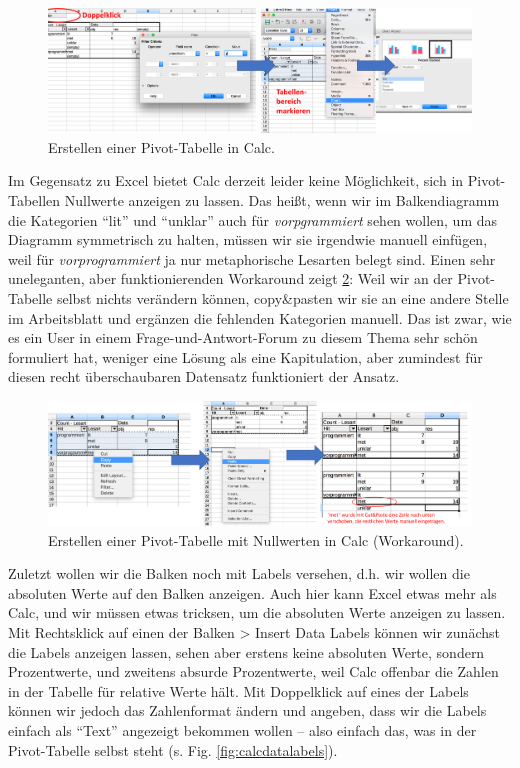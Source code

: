 \documentclass[]{article}
\begin{document}
\begin{figure}
\includegraphics[width=6.66in]{docs/fig/calc_chart} \caption{Erstellen einer Pivot-Tabelle in Calc.}\label{fig:calcchart}
\end{figure}

Im Gegensatz zu Excel bietet Calc derzeit leider keine Möglichkeit, sich
in Pivot-Tabellen Nullwerte anzeigen zu lassen. Das heißt, wenn wir im
Balkendiagramm die Kategorien \enquote{lit} und \enquote{unklar} auch
für \emph{vorpgrammiert} sehen wollen, um das Diagramm symmetrisch zu
halten, müssen wir sie irgendwie manuell einfügen, weil für
\emph{vorprogrammiert} ja nur metaphorische Lesarten belegt sind. Einen
sehr uneleganten, aber funktionierenden Workaround zeigt
\ref{fig:calcchart2}: Weil wir an der Pivot-Tabelle selbst nichts
verändern können, copy\&pasten wir sie an eine andere Stelle im
Arbeitsblatt und ergänzen die fehlenden Kategorien manuell. Das ist
zwar, wie es ein User in einem Frage-und-Antwort-Forum zu diesem Thema
sehr schön formuliert hat, weniger eine Lösung als eine Kapitulation,
aber zumindest für diesen recht überschaubaren Datensatz funktioniert
der Ansatz.

\begin{figure}
\includegraphics[width=6.66in]{docs/fig/calc_chart2} \caption{Erstellen einer Pivot-Tabelle mit Nullwerten in Calc (Workaround).}\label{fig:calcchart2}
\end{figure}

Zuletzt wollen wir die Balken noch mit Labels versehen, d.h. wir wollen
die absoluten Werte auf den Balken anzeigen. Auch hier kann Excel etwas
mehr als Calc, und wir müssen etwas tricksen, um die absoluten Werte
anzeigen zu lassen. Mit Rechtsklick auf einen der Balken \textgreater{}
Insert Data Labels können wir zunächst die Labels anzeigen lassen, sehen
aber erstens keine absoluten Werte, sondern Prozentwerte, und zweitens
absurde Prozentwerte, weil Calc offenbar die Zahlen in der Tabelle für
relative Werte hält. Mit Doppelklick auf eines der Labels können wir
jedoch das Zahlenformat ändern und angeben, dass wir die Labels einfach
als \enquote{Text} angezeigt bekommen wollen -- also einfach das, was in
der Pivot-Tabelle selbst steht (s. Fig. \ref{fig:calcdatalabels}).
\end{document}
